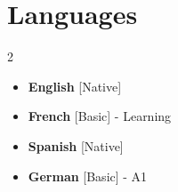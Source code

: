 \documentclass[11pt,a4paper,sans]{moderncv}
\begin{document}
\section{Languages}
\begin{multicols}{2}
    \begin{itemize}[label=\textbullet]
    \item \textbf{English} [Native]
    \item {\textbf{French} [Basic] - Learning}
    \item {\textbf{Spanish} [Native]}
    \item {\textbf{German} [Basic] - A1}
    \end{itemize}
\end{multicols}
\end{document}
